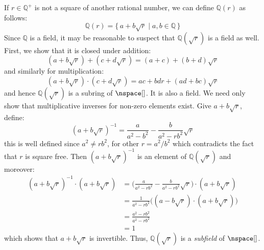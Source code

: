     \begin{example}
        If $r\in\mathbb{Q}^{+}$ is not a square of another rational number,
        we can define $\mathbb{Q}(r)$ as follows:
        \begin{equation}
            \mathbb{Q}(r)=\{\,a+b\sqrt{r}\;|\;a,b\in\mathbb{Q}\,\}
        \end{equation}
        Since $\mathbb{Q}$ is a field, it may be reasonable to suspect that
        $\mathbb{Q}(\sqrt{r})$ is a field as well. First, we show that it is
        closed under addition:
        \begin{equation}
            (a+b\sqrt{r})+(c+d\sqrt{r})=(a+c)+(b+d)\sqrt{r}
        \end{equation}
        and similarly for multiplication:
        \begin{equation}
            (a+b\sqrt{r})\cdot(c+d\sqrt{r})=ac+bdr+(ad+bc)\sqrt{r}
        \end{equation}
        and hence $\mathbb{Q}(\sqrt{r})$ is a subring of $\nspace[]$. It is
        also a field. We need only show that multiplicative inverses for
        non-zero elements exist. Give $a+b\sqrt{r}$, define:
        \begin{equation}
            (a+b\sqrt{r})^{\minus{1}}=\frac{a}{a^{2}-b^{2}}-
                \frac{b}{a^{2}-rb^{2}}\sqrt{r}
        \end{equation}
        this is well defined since $a^{2}\ne{r}b^{2}$, for other
        $r=a^{2}/b^{2}$ which contradicts the fact that $r$ is square free.
        Then $(a+b\sqrt{r})^{\minus{1}}$ is an element of
        $\mathbb{Q}(\sqrt{r})$ and moreover:
        \begin{subequations}
            \begin{align}
                (a+b\sqrt{r})^{\minus{1}}\cdot(a+b\sqrt{r})
                &=\Big(\frac{a}{a^{2}-rb^{2}}-
                    \frac{b}{a^{2}-rb^{2}}\sqrt{r}\Big)\cdot(a+b\sqrt{r})\\
                &=\frac{1}{a^{2}-rb^{2}}\big(
                    (a-b\sqrt{r})\cdot(a+b\sqrt{r})\big)\\
                &=\frac{a^{2}-rb^{2}}{a^{2}-rb^{2}}\\
                &=1
            \end{align}
        \end{subequations}
        which shows that $a+b\sqrt{r}$ is invertible. Thus,
        $\mathbb{Q}(\sqrt{r})$ is a \textit{subfield} of $\nspace[]$.
    \end{example}
